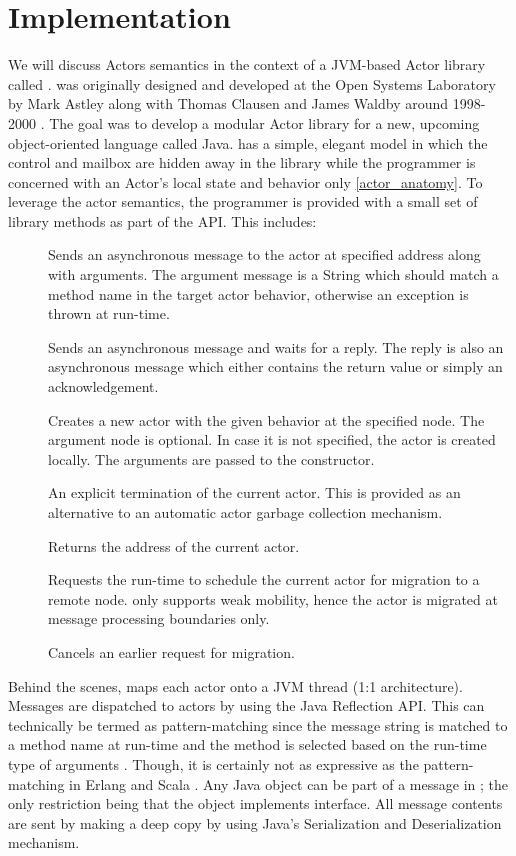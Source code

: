\section{Implementation}
\label{sec-implementation}
We will discuss Actors semantics in the context of a JVM-based Actor library called \af{}. \oaf{} was originally designed and developed at the Open Systems Laboratory by Mark Astley along with Thomas Clausen and James Waldby around 1998-2000 \cite{OAF}. The goal was to develop a modular Actor library for a new, upcoming object-oriented language called Java. \oaf{} has a simple, elegant model in which the control and mailbox are hidden away in the library while the programmer is concerned with an Actor's local state and behavior only \ref{actor_anatomy}. To leverage the actor semantics, the programmer is provided with a small set of library methods as part of the \oaf{} API. This includes:
\begin{description}
 \item[]
Sends an asynchronous message to the actor at specified address along with arguments. The argument message is a String which should match a method name in the target actor behavior, otherwise an exception is thrown at run-time.
 \item[]
Sends an asynchronous message and waits for a reply. The reply is also an asynchronous message which either contains the return value or simply an acknowledgement. 
 \item[]
Creates a new actor with the given behavior at the specified node. The argument node is optional. In case it is not specified, the actor is created locally. The arguments are passed to the constructor.
\item[]
An explicit termination of the current actor. This is provided as an alternative to an automatic actor garbage collection mechanism.
\item[]
Returns the address of the current actor.
\item[]
Requests the run-time to schedule the current actor for migration to a remote node. \oaf{} only supports weak mobility, hence the actor is migrated at message processing boundaries only.
\item[]
Cancels an earlier request for migration.
 \end{description}


Behind the scenes, \oaf{} maps each actor onto a JVM thread (1:1
architecture). Messages are dispatched to actors by using the Java
Reflection API. This can technically be termed as pattern-matching
since the message string is matched to a method name at run-time and
the method is selected based on the run-time type of arguments
\cite{multijava}. Though, it is certainly not as expressive as the
pattern-matching in Erlang \cite{erlang-book} and Scala
\cite{haller2007aut}. Any Java object can be part of a message in
\oaf{}; the only restriction being that the object implements
 interface. All message contents are sent
by making a deep copy by using Java's Serialization and
Deserialization mechanism.


